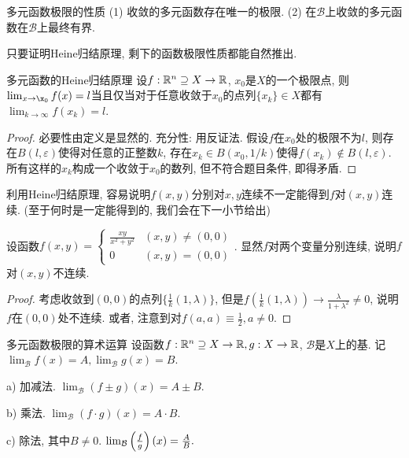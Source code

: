 \begin{proposition}{多元函数极限的性质}
	(1) 收敛的多元函数存在唯一的极限. \qquad (2) 在$\mathcal{B}$上收敛的多元函数在$\mathcal{B}$上最终有界. 
\end{proposition}

只要证明Heine归结原理, 剩下的函数极限性质都能自然推出. 

\begin{theorem}{多元函数的Heine归结原理}
	设$f: \mathbb{R} ^n \supseteq X \to \mathbb{R}$, $x_0$是$X$的一个极限点, 则$\lim_{x\to \x_0}f(x)=l$当且仅当对于任意收敛于$x_0$的点列$\{ x_k \} \in X$都有$\lim_{k\to \infty} f(x_k)=l$. 
\end{theorem}
\begin{proof}
	必要性由定义是显然的. 充分性: 用反证法. 假设$f$在$x_0$处的极限不为$l$, 则存在$B(l,\varepsilon)$使得对任意的正整数$k$, 存在$x_k \in B(x_0,1/k)$使得$f(x_k) \notin B(l,\varepsilon)$. 所有这样的$x_k$构成一个收敛于$x_0$的数列, 但不符合题目条件, 即得矛盾. 
\end{proof}

利用Heine归结原理, 容易说明$f(x,y)$分别对$x,y$连续不一定能得到$f$对$(x,y)$连续. (至于何时是一定能得到的, 我们会在下一小节给出)

\begin{example}
	设函数$f(x,y) = \begin{cases}
 \frac{xy}{x^2+y^2} &  (x,y) \neq (0,0) \\
 0 &  (x,y) = (0,0)
\end{cases}$. 显然$f$对两个变量分别连续, 说明$f$对$(x,y)$不连续. 
\end{example}
\begin{proof}
	考虑收敛到$(0,0)$的点列$\{ \frac{1}{k}(1,\lambda) \}$, 但是$f(\frac{1}{k}(1,\lambda)) \to \frac{\lambda}{1+\lambda ^2} \neq 0$, 说明$f$在$(0,0)$处不连续. 或者, 注意到对$f(a,a) \equiv \frac{1}{2}, a \neq 0$. 
\end{proof}

\begin{theorem}{多元函数极限的算术运算}
	设函数$f:\mathbb{R} ^n \supseteq X \to \mathbb{R}, g:X \to \mathbb{R}$, $\mathcal{B}$是$X$上的基. 记$\lim_{\mathcal{B}} f(x) = A, \lim_{\mathcal{B}} g(x) = B$. 
	
	a) 加减法. $\lim_{\mathcal{B}} (f\pm g)(x) = A\pm B.$
	
	b) 乘法. $\lim_{\mathcal{B}} (f\cdot g)(x) = A \cdot B.$
	
	c) 除法, 其中$B\neq 0$. $\lim_{\mathcal{B}} \left( \frac{f}{g} \right)(x) = \frac{A}{B}.$
\end{theorem}

